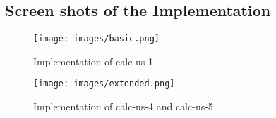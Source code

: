 \documentclass{article}
\begin{document}
\clearpage
\subsection{Screen shots of the Implementation}

\begin{center}
    \begin{figure}[h]
      \texttt{[image: images/basic.png]}
      \caption{Implementation of calc-us-1}
    \end{figure}
\end{center}
\begin{center}
    \begin{figure}[h]
      \texttt{[image: images/extended.png]}
      \caption{Implementation of calc-us-4 and calc-us-5}
    \end{figure}
\end{center}
\end{document}
